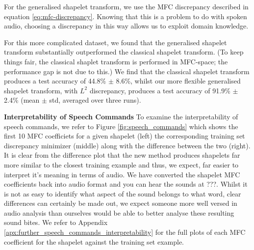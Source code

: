 \documentclass{article}
\theoremstyle{plain}
\theoremstyle{definition}
\newcommand{\boldheading}[1]{

\textbf{#1}\quad}
\begin{document}
For the generalised shapelet transform, we use the MFC discrepancy described in equation \eqref{eq:mfc-discrepancy}. Knowing that this is a problem to do with spoken audio, choosing a discrepancy in this way allows us to exploit domain knowledge.

For this more complicated dataset, we found that the generalised shapelet transform substantially outperformed the classical shapelet transform. (To keep things fair, the classical shaplet transform is performed in MFC-space; the performance gap is not due to this.) We find that  the classical shapelet transform produces a test accuracy of 44.8\% $\pm$ 8.6\%, whilst our more flexible generalised shapelet transform, with $L^2$ discrepancy, produces a test accuracy of 91.9\% $\pm$ 2.4\% (mean $\pm$ std, averaged over three runs).

\boldheading{Interpretability of Speech Commands}
To examine the interpretability of speech commands, we refer to Figure \ref{fig:speech_commands} which shows the first 10 MFC coefficiets for a given shapelet (left) the corresponding training set discrepancy minimizer (middle) along with the difference between the two (right). It is clear from the difference plot that the new method produces shapelets far more similar to the closest training example and thus, we expect, far easier to interpret it's meaning in terms of audio. We have converted the shapelet MFC coefficients back into audio format and you can hear the sounds at ???. Whilst it is not as easy to identify what aspect of the sound belongs to what word, clear differences can certainly be made out, we expect someone more well versed in audio analysis than ourselves would be able to better analyse these resulting sound bites. We refer to Appendix \ref{apx:further_speech_commands_interpretability} for the full plots of each MFC coefficient for the shapelet against the training set example.
\end{document}
